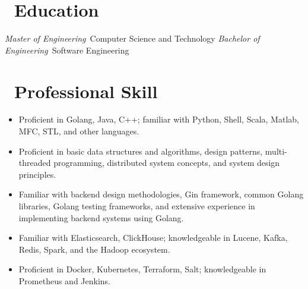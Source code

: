 \documentclass{resume}
\begin{document}



\section{\faGraduationCap\ Education}
\textit{Master of Engineering}\ Computer Science and Technology
\textit{Bachelor of Engineering}\ Software Engineering

\section{\faUsers\ Professional Skill}
\begin{itemize}
  \item Proficient in Golang, Java, C++; familiar with Python, Shell, Scala, Matlab, MFC, STL, and other languages.
  \item Proficient in basic data structures and algorithms, design patterns, multi-threaded programming, distributed system concepts, and system design principles. 
  \item Familiar with backend design methodologies, Gin framework, common Golang libraries, Golang testing frameworks, and extensive experience in implementing backend systems using Golang. 
  \item Familiar with Elasticsearch, ClickHouse; knowledgeable in Lucene, Kafka, Redis, Spark, and the Hadoop ecosystem.
  \item Proficient in Docker, Kubernetes, Terraform, Salt; knowledgeable in Prometheus and Jenkins. 
\end{itemize}
\end{document}
